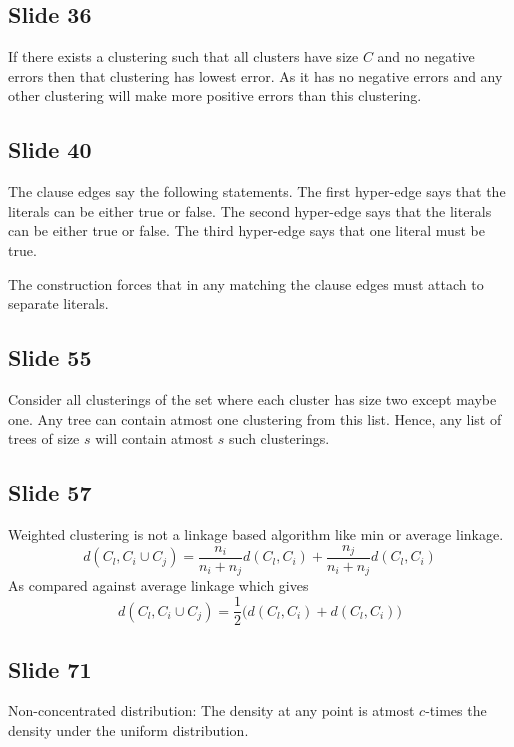 \documentclass[12pt]{article}
\begin{document}
\subsection*{Slide 36}
If there exists a clustering such that all clusters have size $C$ and no negative errors then that clustering has lowest error. As it has no negative errors and any other clustering will make more positive errors than this clustering. 

\subsection*{Slide 40}
The clause edges say the following statements. The first hyper-edge says that the literals can be either true or false. The second hyper-edge says that the literals can be either true or false. The third hyper-edge says that one literal must be true.

The construction forces that in any matching the clause edges must attach to separate literals. 

\subsection*{Slide 55}
Consider all clusterings of the set where each cluster has size two except maybe one. Any tree can contain atmost one clustering from this list. Hence, any list of trees of size $s$ will contain atmost $s$ such clusterings.


\subsection*{Slide 57}
Weighted clustering is not a linkage based algorithm like min or average linkage. 
$$d(C_l, C_i \cup C_j) = \frac{n_i}{n_i + n_j} d(C_l, C_i) + \frac{n_j}{n_i+n_j}d(C_l, C_i)$$
As compared against average linkage which gives
$$d(C_l, C_i \cup C_j) = \frac{1}{2} \Big(d(C_l, C_i) + d(C_l, C_i) \Big)$$

\subsection*{Slide 71}
Non-concentrated distribution: The density at any point is atmost $c$-times the density under the uniform distribution.
\end{document}
